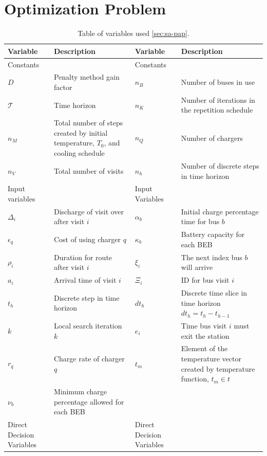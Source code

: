 \documentclass[ee,thesis]{usuthesis}
\newcommand{\T}{\mathcal{T}}                %
\newcommand{\Tau}{T}                        %
\begin{document}
\section{Optimization Problem}
\label{sec:optimization-problem}
\begin{table}[htbp]
\caption{\label{tab:variables}Table of variables used \ref{sec:sa-pap}.}
\centering
\begin{tabularx}{\textwidth}{L{0.3} L{1.2} L{0.3} L{1.2}}
\textbf{Variable} & \textbf{Description} & \textbf{Variable} & \textbf{Description}\\[0pt]
\hline
Constants &  & Constants & \\[0pt]
\(D\) & Penalty method gain factor & \(n_B\) & Number of buses in use\\[0pt]
\(\T\) & Time horizon & \(n_K\) & Number of iterations in the repetition schedule\\[0pt]
\(n_M\) & Total number of steps created by initial temperature, \(\Tau_0\), and cooling schedule & \(n_Q\) & Number of chargers\\[0pt]
\(n_V\) & Total number of visits & \(n_h\) & Number of discrete steps in time horizon\\[0pt]
\hline
Input variables &  & Input Variables & \\[0pt]
\(\Delta_i\) & Discharge of visit over after visit \(i\) & \(\alpha_b\) & Initial charge percentage time for bus \(b\)\\[0pt]
\(\epsilon_q\) & Cost of using charger \(q\) & \(\kappa_b\) & Battery capacity for each BEB\\[0pt]
\(\rho_i\) & Duration for route after visit \(i\) & \(\xi_i\) & The next index bus \(b\) will arrive\\[0pt]
\(a_i\) & Arrival time of visit \(i\) & \(\Xi_i\) & ID for bus visit \(i\)\\[0pt]
\(t_h\) & Discrete step in time horizon & \(dt_h\) & Discrete time slice in time horizon \(dt_h = t_h - t_{h-1}\)\\[0pt]
\(k\) & Local search iteration \(k\) & \(e_i\) & Time bus visit \(i\) must exit the station\\[0pt]
\(r_q\) & Charge rate of charger \(q\) & \(t_m\) & Element of the temperature vector created by temperature function, \(t_m \in t\)\\[0pt]
\(\nu_b\) & Minimum charge percentage allowed for each BEB &  & \\[0pt]
\hline
Direct Decision Variables &  & Direct Decision Variables & \\[0pt]

\end{tabularx}
\end{table}
\end{document}
